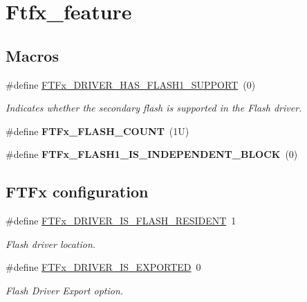 \hypertarget{group__ftfx__feature}{}\section{Ftfx\+\_\+feature}
\label{group__ftfx__feature}
\subsection*{Macros}
\begin{DoxyCompactItemize}
\item 
\mbox{\label{group__ftfx__feature_ga9edaa96c9680f9ff391a3ddf9fef9cf1}} 
\#define \mbox{\hyperlink{group__ftfx__feature_ga9edaa96c9680f9ff391a3ddf9fef9cf1}{F\+T\+Fx\+\_\+\+D\+R\+I\+V\+E\+R\+\_\+\+H\+A\+S\+\_\+\+F\+L\+A\+S\+H1\+\_\+\+S\+U\+P\+P\+O\+RT}}~(0)
\begin{DoxyCompactList}\small\item\em Indicates whether the secondary flash is supported in the Flash driver. \end{DoxyCompactList}\item 
\mbox{\label{group__ftfx__feature_ga931f5edaebda3d6c4d4ed0ff7ae768a4}} 
\#define {\bfseries F\+T\+Fx\+\_\+\+F\+L\+A\+S\+H\+\_\+\+C\+O\+U\+NT}~(1\+U)
\item 
\mbox{\label{group__ftfx__feature_ga07a66a24349e37a885cd950d98a27653}} 
\#define {\bfseries F\+T\+Fx\+\_\+\+F\+L\+A\+S\+H1\+\_\+\+I\+S\+\_\+\+I\+N\+D\+E\+P\+E\+N\+D\+E\+N\+T\+\_\+\+B\+L\+O\+CK}~(0)
\end{DoxyCompactItemize}
\subsection*{F\+T\+Fx configuration}
\begin{DoxyCompactItemize}
\item 
\#define \mbox{\hyperlink{group__ftfx__feature_ga0989b400fb1c51918760be1e367bcbc1}{F\+T\+Fx\+\_\+\+D\+R\+I\+V\+E\+R\+\_\+\+I\+S\+\_\+\+F\+L\+A\+S\+H\+\_\+\+R\+E\+S\+I\+D\+E\+NT}}~1
\begin{DoxyCompactList}\small\item\em Flash driver location. \end{DoxyCompactList}\item 
\#define \mbox{\hyperlink{group__ftfx__feature_gabda161d7ab04497e8004c067f5d849e0}{F\+T\+Fx\+\_\+\+D\+R\+I\+V\+E\+R\+\_\+\+I\+S\+\_\+\+E\+X\+P\+O\+R\+T\+ED}}~0
\begin{DoxyCompactList}\small\item\em Flash Driver Export option. \end{DoxyCompactList}\end{DoxyCompactItemize}
